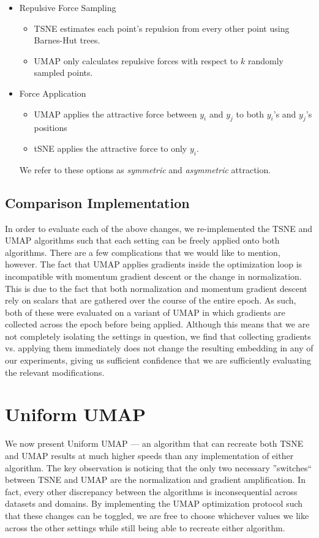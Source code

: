 \documentclass[sigconf, nonacm]{acmart}
\newcommand\ourmethod{Uniform UMAP }
\begin{document}
\begin{itemize}
    \item Repulsive Force Sampling
        \begin{itemize}
        \item TSNE estimates each point's repulsion from every other point using Barnes-Hut trees.
        \item UMAP only calculates repulsive forces with respect to $k$ randomly sampled points.
        \end{itemize}

    \item Force Application
        \begin{itemize}
        \item UMAP applies the attractive force between $y_i$ and $y_j$ to both $y_i$'s and $y_j$'s positions
        \item tSNE applies the attractive force to only $y_i$.
        \end{itemize}
        We refer to these options as \textit{symmetric} and \textit{asymmetric} attraction.

\end{itemize}

\subsection{Comparison Implementation}
In order to evaluate each of the above changes, we re-implemented the TSNE and UMAP algorithms such that each setting can be freely applied onto both algorithms.
There are a few complications that we would like to mention, however. The fact that UMAP applies gradients inside the optimization loop is incompatible
with momentum gradient descent or the change in normalization. This is due to the fact that both normalization and momentum gradient
descent rely on scalars that are gathered over the course of the entire epoch. As such, both of these were evaluated on a variant of UMAP in which gradients are
collected across the epoch before being applied. Although this means that we are not completely isolating the settings in question, we find that collecting
gradients vs. applying them immediately does not change the resulting embedding in any of our experiments, giving us sufficient confidence that we are
sufficiently evaluating the relevant modifications.

\section{\ourmethod} \label{uniform}
We now present \ourmethod  --- an algorithm that can recreate both TSNE and UMAP results at much higher speeds than any implementation of either algorithm.
The key observation is noticing that the only two necessary ''switches`` between TSNE and UMAP are the normalization and gradient amplification. In fact,
every other discrepancy between the algorithms is inconsequential across datasets and domains. By implementing the UMAP optimization protocol such that these
changes can be toggled, we are free to choose whichever values we like across the other settings while still being able to recreate either algorithm.
\end{document}
